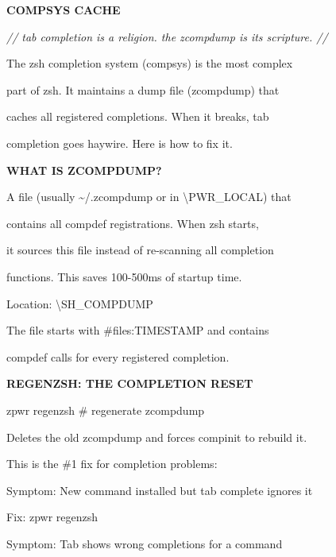 \documentclass[11pt,a4paper,twoside]{book}
\begin{document}
\vspace{10pt}
{\large\bfseries\color{neoncyan} COMPSYS CACHE}\vspace{6pt}

{\small\itshape\color{dimtext} // tab completion is a religion. the zcompdump is its scripture. //}

The zsh completion system (compsys) is the most complex

part of zsh. It maintains a dump file (zcompdump) that

caches all registered completions. When it breaks, tab

completion goes haywire. Here is how to fix it.


\vspace{12pt}
{\bfseries\color{neonyellow} WHAT IS ZCOMPDUMP?}\vspace{4pt}

A file (usually \textasciitilde{}/.zcompdump or in \textbackslash{}PWR\_LOCAL) that

contains all compdef registrations. When zsh starts,

it sources this file instead of re-scanning all completion

functions. This saves 100-500ms of startup time.

Location: \textbackslash{}SH\_COMPDUMP

The file starts with \#files:TIMESTAMP and contains

compdef calls for every registered completion.


\vspace{12pt}
{\bfseries\color{neonyellow} REGENZSH: THE COMPLETION RESET}\vspace{4pt}

\begin{codebox}
zpwr regenzsh                       \# regenerate zcompdump\\
\end{codebox}

Deletes the old zcompdump and forces compinit to rebuild it.

This is the \#1 fix for completion problems:

Symptom: New command installed but tab complete ignores it

\begin{codebox}
Fix:     zpwr regenzsh\\
\end{codebox}

Symptom: Tab shows wrong completions for a command
\end{document}
